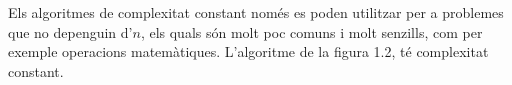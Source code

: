 Els algoritmes de complexitat constant només es poden utilitzar per a problemes que no depenguin d'$n$, els quals són molt poc comuns i molt senzills, com per exemple operacions matemàtiques. L'algoritme de la figura 1.2, té complexitat constant.


